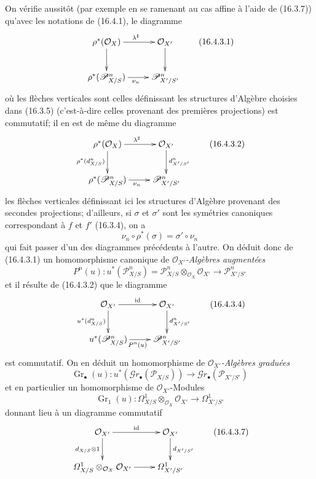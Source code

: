 \begin{env}[16.4.3]
\label{IV.16.4.3}
On vérifie aussitôt (par exemple en se ramenant au cas affine à l'aide de
(16.3.7)) qu'avec les notations de (16.4.1), le diagramme
\[
  \xymatrix{
    \rho^*(\mathcal{O}_X) \ar[r]^{\lambda^\sharp} \ar[d] &
      \mathcal{O}_{X'} \ar[d] \\
    \rho^*(\mathscr{P}_{X/S}^n) \ar[r]_{\nu_n} &
      \mathscr{P}_{X'/S'}^n
  }
  \tag{16.4.3.1}
  \label{IV.16.4.3.1}
\]
où les flèches verticales sont celles définissant les structures d'Algèbre
choisies dans (16.3.5) (c'est-à-dire celles provenant des premières projections)
est commutatif; il en est de même du diagramme
\[
  \xymatrix{
    \rho^*(\mathcal{O}_X) \ar[r]^{\lambda^\sharp}
      \ar[d]_{\rho^*(d_{X/S}^n)} &
      \mathcal{O}_{X'} \ar[d]^{d_{X'/S'}^n} \\
    \rho^*(\mathscr{P}_{X/S}^n) \ar[r]_{\nu_n} &
      \mathscr{P}_{X'/S'}^n
  }
  \tag{16.4.3.2}
  \label{IV.16.4.3.2}
\]
les flèches verticales définissant ici les structures d'Algèbre provenant des
secondes projections; d'ailleurs, si $\sigma$ et $\sigma'$ sont les symétries
canoniques correspondant à $f$ et $f'$ (16.3.4), on a
\[
  \nu_n\circ\rho^*(\sigma)=\sigma'\circ\nu_n
\]
qui fait passer d'un des diagrammes précédents à l'autre. On déduit donc de
(16.4.3.1) un homomorphisme canonique de \emph{$\mathcal{O}_{X'}$-Algèbres augmentées}
\[
  P^n(u):u^*(\mathscr{P}_{X/S}^n)
  =\mathscr{P}_{X/S}^n\otimes_{\mathcal{O}_X}\mathcal{O}_{X'}
  \longrightarrow\mathscr{P}_{X'/S'}^n
  \tag{16.4.3.3}
  \label{IV.16.4.3.3}
\]
et il résulte de (16.4.3.2) que le diagramme
\[
  \xymatrix{
    \mathcal{O}_{X'} \ar[r]^{\operatorname{id}}
      \ar[d]_{u^*(d_{X/S}^n)} &
      \mathcal{O}_{X'} \ar[d]^{d_{X'/S'}^n} \\
    u^*(\mathscr{P}_{X/S}^n) \ar[r]_{P^n(u)} &
      \mathscr{P}_{X'/S'}^n
  }
  \tag{16.4.3.4}
  \label{IV.16.4.3.4}
\]
est commutatif. On en déduit un homomorphisme de \emph{$\mathcal{O}_{X'}$-Algèbres
graduées}
\[
  \operatorname{Gr}_\bullet(u):u^*(\mathscr{G}r_\bullet(\mathscr{P}_{X/S}))
  \longrightarrow\mathscr{G}r_\bullet(\mathscr{P}_{X'/S'})
  \tag{16.4.3.5}
  \label{IV.16.4.3.5}
\]
et en particulier un homomorphisme de $\mathcal{O}_{X'}$-Modules
\[
  \operatorname{Gr}_1(u):
  \varOmega_{X/S}^1\otimes_{\mathcal{O}_X}\mathcal{O}_{X'}
  \longrightarrow\varOmega_{X'/S'}^1
  \tag{16.4.3.6}
  \label{IV.16.4.3.6}
\]
donnant lieu à un diagramme commutatif
\[
  \xymatrix{
    \mathcal{O}_{X'} \ar[r]^{\operatorname{id}}
      \ar[d]_{d_{X/S}\otimes 1} &
      \mathcal{O}_{X'} \ar[d]^{d_{X'/S'}} \\
    \varOmega_{X/S}^1\otimes_{\mathcal{O}_X}\mathcal{O}_{X'} \ar[r] &
      \varOmega_{X'/S'}^1
  }
  \tag{16.4.3.7}
  \label{IV.16.4.3.7}
\]
\end{env}

